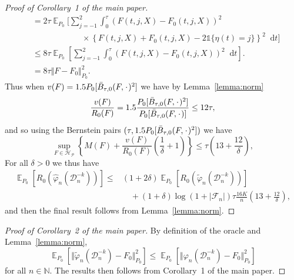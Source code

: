 \documentclass[11pt]{article}
\theoremstyle{thmstyleone}%
\theoremstyle{thmstyletwo}%
\theoremstyle{thmstylethree}%
\DeclareMathOperator{\E}{\mathbb{E}} %
\newcommand{\N}{\mathbb{N}}
\newcommand{\blank}{\makebox[1ex]{\textbf{$\cdot$}}}
\renewcommand{\phi}{\varphi}
\newcommand*\diff{\mathop{}\!\mathrm{d}}
\newcommand{\1}{\mathds{1}}
\newcommand{\data}{\ensuremath{\mathcal{D}}}
\begin{document}
\begin{proof}[Proof of Corollary~1 of the main paper]
\begin{align*}
  & =2\tau
    \E_{P_0}\Bigg[
    \sum_{j=-1}^{2} \int_0^{\tau}
    \left(
    F(t, j, X) - F_0(t, j, X)
    \right)^2
  \\
  & \quad \quad \quad\quad \quad \quad \times
    \left\{
    F(t, j, X) +  F_0(t, j, X)-2 \1{\{\eta(t) = j\}}
    \right\}^2
    \diff t 
    \Bigg]
  \\
  & \leq
    8\tau \E_{P_0}{\left[
    \sum_{j=-1}^{2} \int_0^{\tau}
    \left(
    F(t, j, X) - F_0(t, j, X)
    \right)^2
    \diff t 
    \right]}.
  \\
  & =
    8\tau \Vert F - F_0 \Vert_{P_0}^2.
\end{align*}
Thus when \( v(F) = 1.5 P_0{[\bar{B}_{\tau,0}(F, \blank)^2]} \) we have by
Lemma~\ref{lemma:norm}
\begin{equation*}
  \frac{v(F)}{R_0(F)}
  = 1.5 \frac{P_0{[\bar{B}_{\tau,0}(F, \blank)^2]}}{P_0{[\bar{B}_{\tau,0}(F, \blank)]}}
  \leq 12 \tau,
\end{equation*}
and so using the Bernstein pairs \( (\tau, 1.5 P_0{[\bar{B}_{\tau,0}(F, \blank)^2]}) \) we have
\begin{equation*}
  \sup_{F \in \mathcal{H}_{\mathcal{P}}}
  \left\{
    M(F) + \frac{v(F)}{R_0(F)}
    \left(
      \frac{1}{\delta} + 1
    \right)
  \right\}
  \leq \tau
  \left(
    13 + \frac{12}{\delta}
  \right),
\end{equation*}
For all $\delta>0$ we thus have
\begin{align*}
  \E_{P_0}{\left[ R_0(\hat{\phi}_n(\data_n^{-k})) \right]}
  \leq
  &(1+2\delta)\E_{P_0}{\left[ R_0(\tilde{\phi}_n(\data_n^{-k})) \right]}
  \\
  & \quad
    + (1+\delta)\log(1 + |\mathcal{F}_n|) \tau \frac{16 K}{n}
    \left(
    13 + \frac{12}{\delta}
    \right),
\end{align*}
and then the final result follows from Lemma~\ref{lemma:norm}.
\end{proof}

\begin{proof}[Proof of Corollary~2 of the main paper]
  By definition of the oracle and Lemma~\ref{lemma:norm},
  \begin{equation*}
    \E_{P_0}{\left[ \Vert \tilde{\phi}_n(\data_n^{-k}) - F_0 \Vert_{P_0}^2
      \right]} \leq \E_{P_0}{\left[ \Vert \phi_n(\data_n^{-k}) - F_0 \Vert_{P_0}^2
      \right]}  
  \end{equation*}
  for all \( n \in \N \). The results then follows from
  Corollary~1 of the main paper.
\end{proof}
\end{document}
